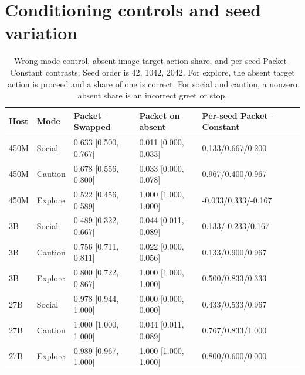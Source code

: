 \documentclass[10pt]{article}
\begin{document}
\section{Conditioning controls and seed variation}
\begin{table}[htbp]\centering\small
\caption{Wrong-mode control, absent-image target-action share, and
per-seed Packet--Constant contrasts. Seed order is 42, 1042, 2042.
For explore, the absent target action is proceed and a share of one
is correct. For social and caution, a nonzero absent share is an
incorrect greet or stop.}\label{tab:controls}
\begin{tabular}{lllll}\toprule
Host & Mode & Packet--Swapped & Packet on absent & Per-seed Packet--Constant\\\midrule
450M & Social & 0.633 [0.500, 0.767] & 0.011 [0.000, 0.033] & 0.133/0.667/0.200 \\
450M & Caution & 0.678 [0.556, 0.800] & 0.033 [0.000, 0.078] & 0.967/0.400/0.967 \\
450M & Explore & 0.522 [0.456, 0.589] & 1.000 [1.000, 1.000] & -0.033/0.333/-0.167 \\
3B & Social & 0.489 [0.322, 0.667] & 0.044 [0.011, 0.089] & 0.133/-0.233/0.167 \\
3B & Caution & 0.756 [0.711, 0.811] & 0.022 [0.000, 0.056] & 0.133/0.900/0.967 \\
3B & Explore & 0.800 [0.722, 0.867] & 1.000 [1.000, 1.000] & 0.500/0.833/0.333 \\
27B & Social & 0.978 [0.944, 1.000] & 0.000 [0.000, 0.000] & 0.433/0.533/0.967 \\
27B & Caution & 1.000 [1.000, 1.000] & 0.044 [0.011, 0.089] & 0.767/0.833/1.000 \\
27B & Explore & 0.989 [0.967, 1.000] & 1.000 [1.000, 1.000] & 0.800/0.600/0.000 \\

\bottomrule\end{tabular}
\end{table}
\end{document}
